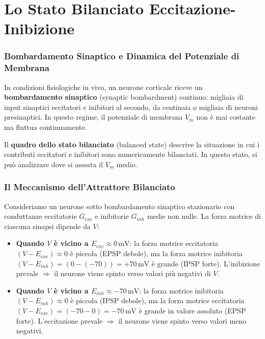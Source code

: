 \section{Lo Stato Bilanciato Eccitazione-Inibizione}

\subsubsection{Bombardamento Sinaptico e Dinamica del Potenziale di Membrana}

In condizioni fisiologiche in vivo, un neurone corticale riceve un \textbf{bombardamento sinaptico} (synaptic bombardment) continuo: migliaia di input sinaptici eccitatori e inibitori al secondo, da centinaia o migliaia di neuroni presinaptici. In questo regime, il potenziale di membrana $V_m$ non è mai costante ma fluttua continuamente.

Il \textbf{quadro dello stato bilanciato} (balanced state) descrive la situazione in cui i contributi eccitatori e inibitori sono numericamente bilanciati. In questo stato, si può analizzare dove si assesta il $V_m$ medio.

\subsubsection{Il Meccanismo dell'Attrattore Bilanciato}

Consideriamo un neurone sotto bombardamento sinaptico stazionario con conduttanze eccitatorie $G_{exc}$ e inibitorie $G_{inh}$ medie non nulle. La forza motrice di ciascuna sinapsi dipende da $V$:

\begin{itemize}
    \item \textbf{Quando $V$ è vicino a $E_{exc} \approx 0 \, \text{mV}$}: la forza motrice eccitatoria $(V - E_{exc}) \approx 0$ è piccola (EPSP debole), ma la forza motrice inibitoria $(V - E_{inh}) = (0 - (-70)) = +70 \, \text{mV}$ è grande (IPSP forte). L'inibizione prevale $\Rightarrow$ il neurone viene spinto verso valori più negativi di $V$.
    \item \textbf{Quando $V$ è vicino a $E_{inh} \approx -70 \, \text{mV}$}: la forza motrice inibitoria $(V - E_{inh}) \approx 0$ è piccola (IPSP debole), ma la forza motrice eccitatoria $(V - E_{exc}) = (-70 - 0) = -70 \, \text{mV}$ è grande in valore assoluto (EPSP forte). L'eccitazione prevale $\Rightarrow$ il neurone viene spinto verso valori meno negativi.
\end{itemize}

